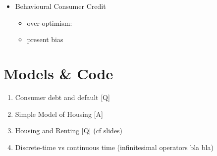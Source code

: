 \documentclass[a4paper,11pt]{article}
\begin{document}
\begin{itemize}
\item Behavioural Consumer Credit
  \begin{itemize}
  \item over-optimism: \citep{exler2020consumer}
  \item present bias \citep{laibson2021present}
  \end{itemize}
\end{itemize}

\section{Models \& Code}

\begin{enumerate}
\item Consumer debt and default [Q]
\item Simple Model of Housing [A]
\item Housing and Renting [Q] (cf slides)
\item Discrete-time vs continuous time (infinitesimal operators bla bla)
\end{enumerate}



\end{document}
